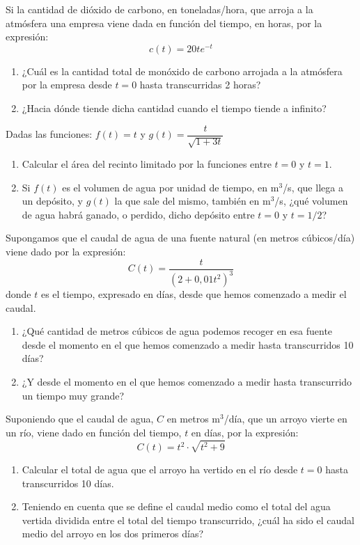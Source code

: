 {Si la cantidad de dióxido de carbono, en toneladas/hora, que arroja a la atmósfera una empresa viene dada en función del tiempo, en horas, por la expresión:
\[
c(t)=20te^{-t}
\]
\begin{enumerate}
\item ¿Cuál es la cantidad total de monóxido de carbono arrojada a la atmósfera por la empresa desde $t=0$ hasta transcurridas 2 horas?
\item ¿Hacia dónde tiende dicha cantidad cuando el tiempo tiende a infinito?
\end{enumerate}
}


{Dadas las funciones: $f(t) = t$ y $g(t) = \dfrac{t} {{\sqrt{1 + 3t} }}$
\begin{enumerate}
\item Calcular el área del recinto limitado por la funciones entre $t=0$ y $t=1$.
\item Si $f(t)$ es el volumen de agua por unidad de tiempo, en m$^3$/s, que llega a un depósito, y $g(t)$ la que sale del mismo, también en m$^3$/s, ¿qué volumen de agua habrá ganado, o perdido, dicho depósito entre $t=0$ y $t=1/2$?
\end{enumerate}
}


{Supongamos que el caudal de agua de una fuente natural (en metros cúbicos/día)
viene dado por la expresión:
\[
C(t) = \frac{t}{{\left( {2 + 0,01 t^2 } \right)^3 }}
\]
donde $t$ es el tiempo, expresado en días, desde que hemos comenzado a medir el caudal.
\begin{enumerate}
\item ¿Qué cantidad de metros cúbicos de agua podemos recoger en esa fuente desde el momento en el que hemos comenzado a medir hasta transcurridos 10 días?
\item ¿Y desde el momento en el que hemos comenzado a medir hasta transcurrido un tiempo muy grande?
\end{enumerate}
}


{Suponiendo que el caudal de agua, $C$ en metros m$^3$/día, que un arroyo vierte en un río, viene dado en función del tiempo, $t$ en días, por la expresión:
\[
C(t) = t^2  \cdot \sqrt {t^2  + 9}
\]
\begin{enumerate}
\item Calcular el total de agua que el arroyo ha vertido en el río desde $t=0$ hasta transcurridos 10 días.
\item Teniendo en cuenta que se define el caudal medio como el total del agua vertida dividida entre el total del tiempo transcurrido, ¿cuál ha sido el caudal medio del arroyo en los dos primeros días?
\end{enumerate}
}


